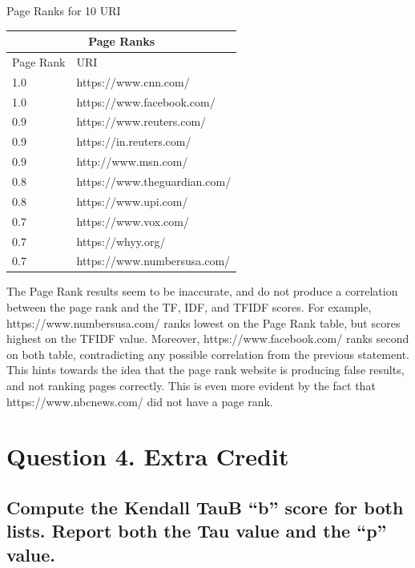 \documentclass[11pt]{scrartcl} %
\begin{document}
\begin{center}
\begin{LARGE} \tabto{1cm}Page Ranks for 10 URI \end{LARGE} \newline \newline
\begin{tabular}{ |p{1cm}||p{6cm}|  }
 \hline
 \multicolumn{2}{|c|}{Page Ranks} \\
 \hline
 Page Rank & URI\\
 \hline
1.0& https://www.cnn.com/ \\
1.0& https://www.facebook.com/ \\
0.9& https://www.reuters.com/ \\
0.9& https://in.reuters.com/\\
0.9& http://www.msn.com/ \\
0.8& https://www.theguardian.com/ \\
0.8& https://www.upi.com/ \\
0.7& https://www.vox.com/ \\
0.7& https://whyy.org/ \\
0.7& https://www.numbersusa.com/ \\
 \hline
\end{tabular}
\end{center}
\bigskip
\tabto{2.0cm} The Page Rank results seem to be inaccurate, and do not produce a correlation between the page rank and the TF, IDF, and TFIDF scores. For example, https://www.numbersusa.com/ ranks lowest on the Page Rank table, but scores highest on the TFIDF value. \newline \newline
\tabto{2.0cm} Moreover, https://www.facebook.com/ ranks second on both table, contradicting any possible correlation from the previous statement. This hints towards the idea that the page rank website is producing false results, and not ranking pages correctly. This is even more evident by the fact that https://www.nbcnews.com/ did not have a page rank. 
\pagebreak
\section*{Question 4. Extra Credit}

\subsection*{Compute the Kendall TauB ``b'' score for both lists. Report both the
Tau value and the ``p'' value.}
\bigskip\bigskip
\end{document}

